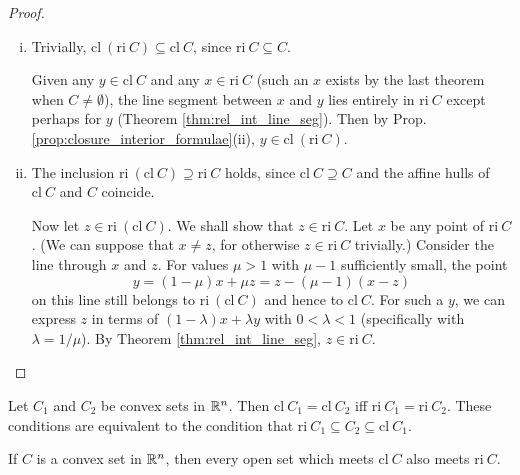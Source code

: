 \documentclass[11pt,a4paper]{article}
\begin{document}
\begin{proof}
    \begin{enumerate}[(i)]
        \item \forward Trivially, $\mathrm{cl}\ (\mathrm{ri}\ C) \subseteq \mathrm{cl}\ C$, since $\mathrm{ri}\ C\subseteq C$.
        
        \converse Given any $y\in \mathrm{cl}\ C$ and any $x\in \mathrm{ri}\ C$ (such an $x$ exists by the last theorem when $C\neq \emptyset$), the line segment between $x$ and $y$ lies entirely in $\mathrm{ri}\ C$ except perhaps for $y$ (Theorem \ref{thm:rel_int_line_seg}). Then by Prop. \ref{prop:closure_interior_formulae}(ii), $y\in \mathrm{cl}\ (\mathrm{ri}\ C)$.

        \item \converse The inclusion $\mathrm{ri}\ (\mathrm{cl}\ C)\supseteq \mathrm{ri}\ C$ holds, since $\mathrm{cl}\ C\supseteq C$ and the affine hulls of $\mathrm{cl}\ C$ and $C$ coincide.
        
        \forward Now let $z\in \mathrm{ri}\ (\mathrm{cl}\ C)$. We shall show that $z\in \mathrm{ri}\ C$. Let $x$ be any point of $\mathrm{ri}\ C$. (We can suppose that $x\neq z$, for otherwise $z\in \mathrm{ri}\ C$ trivially.) Consider the line through $x$ and $z$. For values $\mu>1$ with $\mu-1$ sufficiently small, the point
        \begin{equation*}
            y = (1-\mu) x+ \mu z = z - (\mu-1)(x-z)
        \end{equation*}
        on this line still belongs to $\mathrm{ri}\ (\mathrm{cl}\ C)$ and hence to $\mathrm{cl}\ C$. For such a $y$, we can express $z$ in terms of $(1-\lambda)x+\lambda y$ with $0<\lambda <1$ (specifically with $\lambda=1/\mu$). By Theorem \ref{thm:rel_int_line_seg}, $z\in \mathrm{ri}\ C$.
    \end{enumerate}
\end{proof}

\begin{corollary}\label{cor:cl_ri_convex_sets}
    Let $C_1$ and $C_2$ be convex sets in $\mathbb{R}^n$. Then $\mathrm{cl}\ C_1 = \mathrm{cl}\ C_2$ iff $\mathrm{ri}\ C_1 = \mathrm{ri}\ C_2$. These conditions are equivalent to the condition that $\mathrm{ri}\ C_1\subseteq C_2\subseteq \mathrm{cl}\ C_1$.
\end{corollary}

\begin{corollary}
    If $C$ is a convex set in $\mathbb{R}^n$, then every open set which meets $\mathrm{cl}\ C$ also meets $\mathrm{ri}\ C$.
\end{corollary}
\end{document}
